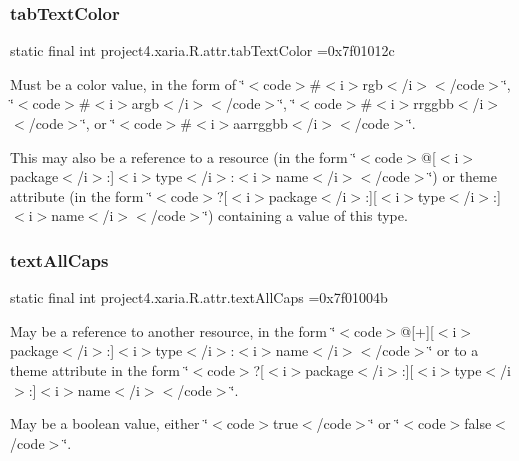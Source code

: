 \subsubsection{\texorpdfstring{tab\+Text\+Color}{tabTextColor}}
{\footnotesize\ttfamily static final int project4.\+xaria.\+R.\+attr.\+tab\+Text\+Color =0x7f01012c\hspace{0.3cm}{\ttfamily [static]}}

Must be a color value, in the form of \char`\"{}$<$code$>$\#$<$i$>$rgb$<$/i$>$$<$/code$>$\char`\"{}, \char`\"{}$<$code$>$\#$<$i$>$argb$<$/i$>$$<$/code$>$\char`\"{}, \char`\"{}$<$code$>$\#$<$i$>$rrggbb$<$/i$>$$<$/code$>$\char`\"{}, or \char`\"{}$<$code$>$\#$<$i$>$aarrggbb$<$/i$>$$<$/code$>$\char`\"{}. 

This may also be a reference to a resource (in the form \char`\"{}$<$code$>$@\mbox{[}$<$i$>$package$<$/i$>$\+:\mbox{]}$<$i$>$type$<$/i$>$\+:$<$i$>$name$<$/i$>$$<$/code$>$\char`\"{}) or theme attribute (in the form \char`\"{}$<$code$>$?\mbox{[}$<$i$>$package$<$/i$>$\+:\mbox{]}\mbox{[}$<$i$>$type$<$/i$>$\+:\mbox{]}$<$i$>$name$<$/i$>$$<$/code$>$\char`\"{}) containing a value of this type. \mbox{\label{classproject4_1_1xaria_1_1R_1_1attr_a62998ba8d69bd8fda88528b4c2235325}} 
\subsubsection{\texorpdfstring{text\+All\+Caps}{textAllCaps}}
{\footnotesize\ttfamily static final int project4.\+xaria.\+R.\+attr.\+text\+All\+Caps =0x7f01004b\hspace{0.3cm}{\ttfamily [static]}}

May be a reference to another resource, in the form \char`\"{}$<$code$>$@\mbox{[}+\mbox{]}\mbox{[}$<$i$>$package$<$/i$>$\+:\mbox{]}$<$i$>$type$<$/i$>$\+:$<$i$>$name$<$/i$>$$<$/code$>$\char`\"{} or to a theme attribute in the form \char`\"{}$<$code$>$?\mbox{[}$<$i$>$package$<$/i$>$\+:\mbox{]}\mbox{[}$<$i$>$type$<$/i$>$\+:\mbox{]}$<$i$>$name$<$/i$>$$<$/code$>$\char`\"{}. 

May be a boolean value, either \char`\"{}$<$code$>$true$<$/code$>$\char`\"{} or \char`\"{}$<$code$>$false$<$/code$>$\char`\"{}. \mbox{\label{classproject4_1_1xaria_1_1R_1_1attr_ad8c07b79b8eef25e90fa8698f28917cb}} 
